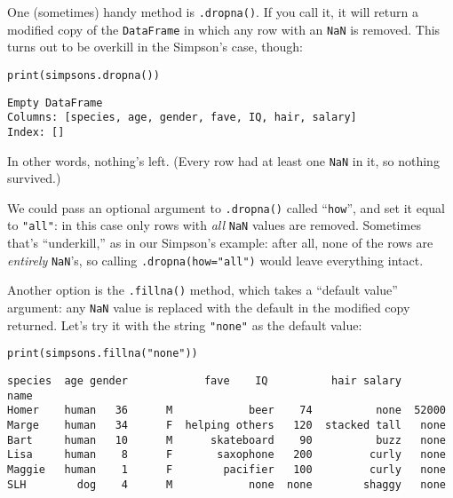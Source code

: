 
One (sometimes) handy method is \texttt{.dropna()}. If you call it, it will
return a modified copy of the \texttt{DataFrame} in which any row with an
\texttt{NaN} is removed. This turns out to be overkill in the Simpson's case,
though:

\begin{Verbatim}[fontsize=\small,samepage=true,frame=single,framesep=3mm]
print(simpsons.dropna())
\end{Verbatim}
\vspace{-.2in}

\begin{Verbatim}[fontsize=\small,samepage=true,frame=leftline,framesep=5mm,framerule=1mm]
Empty DataFrame
Columns: [species, age, gender, fave, IQ, hair, salary]
Index: []
\end{Verbatim}

In other words, nothing's left. (Every row had at least one \texttt{NaN} in
it, so nothing survived.)

We could pass an optional argument to \texttt{.dropna()} called
``\texttt{how}'', and set it equal to \texttt{"all"}: in this case only rows
with \textit{all} \texttt{NaN} values are removed. Sometimes that's
``underkill,'' as in our Simpson's example: after all, none of the rows are
\textit{entirely} \texttt{NaN}'s, so calling \texttt{.dropna(how="all")}
would leave everything intact.


Another option is the \texttt{.fillna()} method, which takes a ``default
value'' argument: any \texttt{NaN} value is replaced with the default in the
modified copy returned. Let's try it with the string \texttt{"none"} as the
default value:

\begin{Verbatim}[fontsize=\small,samepage=true,frame=single,framesep=3mm]
print(simpsons.fillna("none"))
\end{Verbatim}
\vspace{-.2in}

\begin{Verbatim}[fontsize=\small,samepage=true,frame=leftline,framesep=5mm,framerule=1mm]
       species  age gender            fave    IQ          hair salary
name                                                                 
Homer    human   36      M            beer    74          none  52000
Marge    human   34      F  helping others   120  stacked tall   none
Bart     human   10      M      skateboard    90          buzz   none
Lisa     human    8      F       saxophone   200         curly   none
Maggie   human    1      F        pacifier   100         curly   none
SLH        dog    4      M            none  none        shaggy   none
\end{Verbatim}

